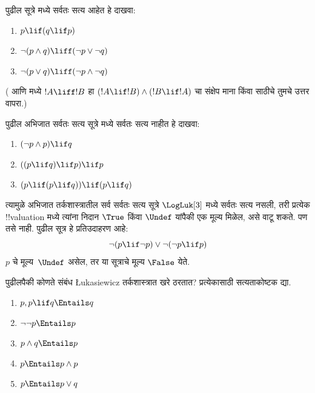 \documentclass[../../../include/open-logic-section]{subfiles}
\begin{document}
\begin{prob}
  पुढील सूत्रे \LogLuk[3] मध्ये सर्वतः सत्य आहेत हे दाखवा:
  \begin{enumerate}
    \item $p \lif (q \lif p)$
    \item\label{mvl:thr:luk:prob:luk-taut-2} $\lnot(p \land q) \liff (\lnot p \lor \lnot q)$
    \item\label{mvl:thr:luk:prob:luk-taut-3} $\lnot(p \lor q) \liff (\lnot p \land \lnot q)$
  \end{enumerate}
  ( आणि
   मध्ये $!A \liff !B$
  हा $(!A \lif !B) \land (!B \lif !A)$ चा संक्षेप माना किंवा
   साठीचे तुमचे उत्तर वापरा.)
\end{prob}

\begin{prob}
  पुढील अभिजात सर्वतः सत्य सूत्रे \LogLuk[3] मध्ये सर्वतः सत्य
  नाहीत हे दाखवा:
  \begin{enumerate}
    \item $(\lnot p \land p) \lif q$
    \item $((p \lif q) \lif p) \lif p$
    \item $(p \lif (p \lif q)) \lif (p \lif q)$
  \end{enumerate}
\end{prob}

त्यामुळे अभिजात तर्कशास्त्रातील सर्व सर्वतः सत्य सूत्रे
$\LogLuk[3]$ मध्ये सर्वतः सत्य नसली, तरी प्रत्येक
!!{valuation} मध्ये त्यांना निदान $\True$ किंवा $\Undef$
यांपैकी एक मूल्य मिळेल, असे वाटू शकते. पण तसे नाही.
पुढील सूत्र हे प्रतिउदाहरण आहे:
\[
  \lnot(p \lif \lnot p) \lor \lnot(\lnot p \lif p)
\]
$p$ चे मूल्य~$\Undef$ असेल, तर या सूत्राचे मूल्य $\False$ येते.

\begin{prob}
  पुढीलपैकी कोणते संबंध \L ukasiewicz तर्कशास्त्रात खरे ठरतात?
  प्रत्येकासाठी सत्यताकोष्टक द्या.
  \begin{enumerate}
    \item $p, p \lif q \Entails q$
    \item $\lnot\lnot p \Entails p$
    \item $p \land q \Entails p$
    \item $p \Entails p \land p$
    \item $p \Entails p \lor q$
  \end{enumerate}
\end{prob}
\end{document}
